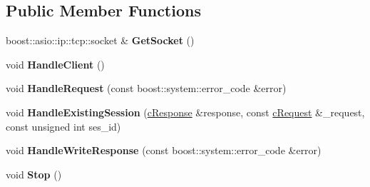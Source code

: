 \subsection*{\-Public \-Member \-Functions}
\begin{DoxyCompactItemize}
\item 
\hypertarget{classhttp__server_1_1cHttpConnection_ad9175494a963a2e2f7fafb31c24c4783}{boost\-::asio\-::ip\-::tcp\-::socket \& {\bfseries \-Get\-Socket} ()}\label{classhttp__server_1_1cHttpConnection_ad9175494a963a2e2f7fafb31c24c4783}

\item 
\hypertarget{classhttp__server_1_1cHttpConnection_a0559eb591a884a16d90f2e061a5530f6}{void {\bfseries \-Handle\-Client} ()}\label{classhttp__server_1_1cHttpConnection_a0559eb591a884a16d90f2e061a5530f6}

\item 
\hypertarget{classhttp__server_1_1cHttpConnection_aad4d12163015ab391b40bb15b9a5ecb0}{void {\bfseries \-Handle\-Request} (const boost\-::system\-::error\-\_\-code \&error)}\label{classhttp__server_1_1cHttpConnection_aad4d12163015ab391b40bb15b9a5ecb0}

\item 
\hypertarget{classhttp__server_1_1cHttpConnection_aa9343fd8557891c23c8fd73b5641fedd}{void {\bfseries \-Handle\-Existing\-Session} (\hyperlink{classhttp__server_1_1cResponse}{c\-Response} \&response, const \hyperlink{classhttp__server_1_1cRequest}{c\-Request} \&\-\_\-request, const unsigned int ses\-\_\-id)}\label{classhttp__server_1_1cHttpConnection_aa9343fd8557891c23c8fd73b5641fedd}

\item 
\hypertarget{classhttp__server_1_1cHttpConnection_a128cc40027898c87335516147b767b87}{void {\bfseries \-Handle\-Write\-Response} (const boost\-::system\-::error\-\_\-code \&error)}\label{classhttp__server_1_1cHttpConnection_a128cc40027898c87335516147b767b87}

\item 
\hypertarget{classhttp__server_1_1cHttpConnection_aac06a1408cb3b2e20e08817858e45443}{void {\bfseries \-Stop} ()}\label{classhttp__server_1_1cHttpConnection_aac06a1408cb3b2e20e08817858e45443}

\end{DoxyCompactItemize}
